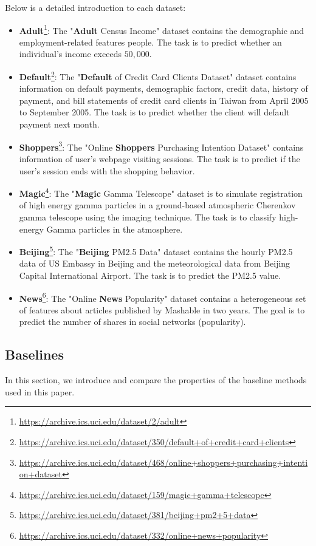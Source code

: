 Below is a detailed introduction to each dataset:
\begin{itemize}
    \item \textbf{Adult}\footnote{\url{https://archive.ics.uci.edu/dataset/2/adult}}: The "\textbf{Adult} Census Income" dataset contains the demographic and employment-related features people.  The task is to predict whether an individual's income exceeds $50,000$.
    \item \textbf{Default}\footnote{\url{https://archive.ics.uci.edu/dataset/350/default+of+credit+card+clients}}: The "\textbf{Default} of Credit Card Clients Dataset" dataset contains information on default payments, demographic factors, credit data, history of payment, and bill statements of credit card clients in Taiwan from April 2005 to September 2005. The task is to predict whether the client will default payment next month.
    \item \textbf{Shoppers}\footnote{\url{https://archive.ics.uci.edu/dataset/468/online+shoppers+purchasing+intention+dataset}}: The "Online \textbf{Shoppers} Purchasing Intention Dataset" contains information of user's webpage visiting sessions. The task is to predict if the user's session ends with the shopping behavior.
    \item \textbf{Magic}\footnote{\url{https://archive.ics.uci.edu/dataset/159/magic+gamma+telescope}}: The "\textbf{Magic} Gamma Telescope" dataset is to simulate registration of high energy gamma particles in a ground-based atmospheric Cherenkov gamma telescope using the imaging technique. The task is to classify high-energy Gamma particles in the atmosphere.
    \item \textbf{Beijing}\footnote{\url{https://archive.ics.uci.edu/dataset/381/beijing+pm2+5+data}}: The "\textbf{Beijing} PM2.5 Data" dataset contains the hourly PM2.5 data of US Embassy in Beijing and the meteorological data from Beijing Capital International Airport. The task is to predict the PM2.5 value.
    \item \textbf{News}\footnote{\url{https://archive.ics.uci.edu/dataset/332/online+news+popularity}}: The "Online \textbf{News} Popularity" dataset contains a heterogeneous set of features about articles published by Mashable in two years. The goal is to predict the number of shares in social networks (popularity).
\end{itemize}

\subsection{Baselines}\label{appendix:baseline}
In this section, we introduce and compare the properties of the baseline methods used in this paper. 

